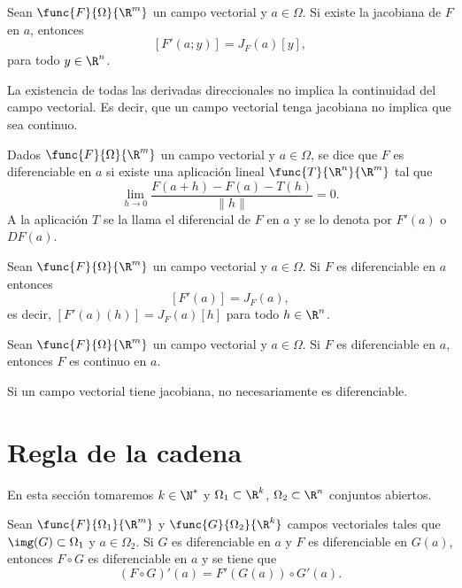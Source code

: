 \documentclass[a4,11pt]{aleph-notas}
\begin{document}
\begin{prop}
    Sean $\func{F}{\Omega}{\R^m}$ un campo vectorial y $a\in \Omega$. Si existe la jacobiana de $F$ en $a$, entonces
    \[
        [F'(a;y)]= J_F(a) [y],
    \]
    para todo $y\in\R^n$.
\end{prop}

\begin{advertencia}
    La existencia de todas las derivadas direccionales no implica la continuidad del campo vectorial. Es decir, que un campo vectorial tenga jacobiana no implica que sea continuo.
\end{advertencia}

\begin{defi}[Diferenciabilidad]
    Dados $\func{F}{\Omega}{\R^m}$ un campo vectorial y $a\in \Omega$, se dice que $F$ es diferenciable en $a$ si existe una aplicación lineal $\func{T}{\R^n}{\R^m}$ tal que
    \[
        \lim_{h\to 0}\frac{F(a+h)-F(a)-T(h)}{\|h\|}=0.
    \]
    A la aplicación $T$ se la llama el diferencial de $F$ en $a$ y se lo denota por $F'(a)$ o $DF(a)$.
\end{defi}

\begin{teo}
    Sean $\func{F}{\Omega}{\R^m}$ un campo vectorial y $a\in \Omega$. Si $F$ es diferenciable en $a$ entonces
    \[
        [F'(a)]=J_F(a),
    \]
    es decir, $[F'(a)(h)]=J_F(a) [h]$ para todo $h\in\R^n$.
\end{teo}

\begin{teo}
    Sean $\func{F}{\Omega}{\R^m}$ un campo vectorial y $a\in \Omega$. Si $F$ es diferenciable en $a$, entonces $F$ es continuo en $a$.
\end{teo}

\begin{advertencia}
    Si un campo vectorial tiene jacobiana, no necesariamente es diferenciable.
\end{advertencia}

\section{Regla de la cadena}

En esta sección tomaremos $k\in\N^*$ y $\Omega_1\subset \R^k$, $\Omega_2\subset \R^n$ conjuntos abiertos.

\begin{teo}
    Sean $\func{F}{\Omega_1}{\R^m}$ y $\func{G}{\Omega_2}{\R^k}$ campos vectoriales tales que $\img(G)\subset \Omega_1$ y $a\in \Omega_2$. Si $G$ es diferenciable en $a$ y $F$ es diferenciable en $G(a)$, entonces $F\circ G$ es diferenciable en $a$ y se tiene que
    \[
        (F\circ G)'(a) = F'(G(a))\circ G'(a).
    \]
\end{teo}
\end{document}
